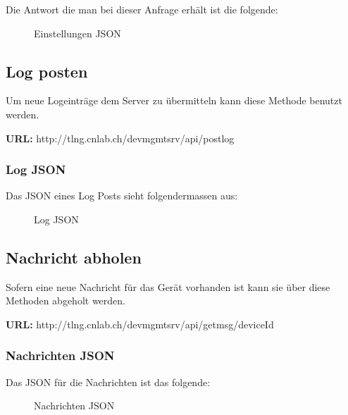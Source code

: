 Die Antwort die man bei dieser Anfrage erhält ist die folgende:

\begin{figure}[H]
	\centering
	\caption{Einstellungen JSON}
	
\end{figure}


\subsection{Log posten}

Um neue Logeinträge dem Server zu übermitteln kann diese Methode benutzt werden.

{\bf URL: }http://tlng.cnlab.ch/devmgmtsrv/api/postlog

\subsubsection{Log JSON}

Das JSON eines Log Posts sieht folgendermassen aus:

\begin{figure}[H]
	\centering
	\caption{Log JSON}
	
\end{figure}

\subsection{Nachricht abholen}

Sofern eine neue Nachricht für das Gerät vorhanden ist kann sie über diese Methoden abgeholt werden.

{\bf URL: }http://tlng.cnlab.ch/devmgmtsrv/api/getmsg/{deviceId}

\subsubsection{Nachrichten JSON}
Das JSON für die Nachrichten ist das folgende:
\begin{figure}[H]
	\centering
	\caption{Nachrichten JSON}
	
\end{figure}


